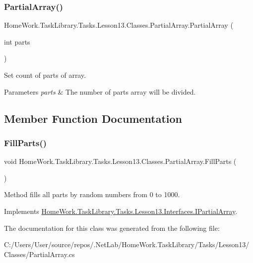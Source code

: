 \subsubsection{\texorpdfstring{PartialArray()}{PartialArray()}}
{\footnotesize\ttfamily Home\+Work.\+Task\+Library.\+Tasks.\+Lesson13.\+Classes.\+Partial\+Array.\+Partial\+Array (\begin{DoxyParamCaption}\item[{int}]{parts }\end{DoxyParamCaption})}



Set count of parts of array. 


\begin{DoxyParams}{Parameters}
{\em parts} & The number of parts array will be divided.\\
\hline
\end{DoxyParams}


\subsection{Member Function Documentation}
\mbox{\label{class_home_work_1_1_task_library_1_1_tasks_1_1_lesson13_1_1_classes_1_1_partial_array_a87d2c4381a229c73895d4ea5540d1854}} 
\subsubsection{\texorpdfstring{FillParts()}{FillParts()}}
{\footnotesize\ttfamily void Home\+Work.\+Task\+Library.\+Tasks.\+Lesson13.\+Classes.\+Partial\+Array.\+Fill\+Parts (\begin{DoxyParamCaption}{ }\end{DoxyParamCaption})}



Method fills all parts by random numbers from 0 to 1000. 



Implements \mbox{\hyperlink{interface_home_work_1_1_task_library_1_1_tasks_1_1_lesson13_1_1_interfaces_1_1_i_partial_array_a8b4b7d6323832908c7c5af53904a9697}{Home\+Work.\+Task\+Library.\+Tasks.\+Lesson13.\+Interfaces.\+I\+Partial\+Array}}.



The documentation for this class was generated from the following file\+:\begin{DoxyCompactItemize}
\item 
C\+:/\+Users/\+User/source/repos/.\+Net\+Lab/\+Home\+Work.\+Task\+Library/\+Tasks/\+Lesson13/\+Classes/Partial\+Array.\+cs\end{DoxyCompactItemize}
